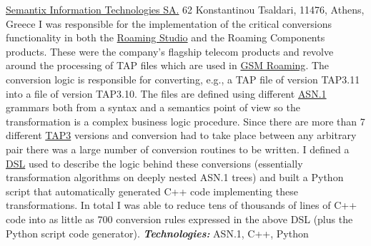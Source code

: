 \documentclass[helvetica,english,logo,notitle,totpages,utf8]{europecv2013}
\newcommand{\technologies}[0]{\textbf{\textit{Technologies:}}}
\begin{document}
\begin{europecv}
                   {\href{http://www.semantix.gr}{Semantix Information Technologies SA.}}
                   {62 Konstantinou Tsaldari, 11476, Athens, Greece}
                   {
    I was responsible for the implementation of the critical 
    conversions functionality in both the \href{http://www.tapeditor.com/}{Roaming Studio} and the Roaming Components products. These were
    the company's flagship telecom products and revolve around the processing of TAP
    files which are used in \href{https://en.wikipedia.org/wiki/Roaming}{GSM Roaming}.
    The conversion logic is responsible for converting, e.g., a TAP file of version TAP3.11 into a file
    of version TAP3.10. The files are defined using
    different \href{https://en.wikipedia.org/wiki/Abstract_Syntax_Notation_One}{ASN.1} grammars both from
    a syntax and a semantics point of view so
    the transformation is a complex business logic procedure. Since there are more than 7 different \href{http://what-when-how.com/roaming-in-wireless-networks/transferred-account-procedures-billing-and-settlement/}{TAP3}
    versions and conversion had to take place between any arbitrary pair there was
    a large number of conversion routines to be written. I defined a
    \href{https://en.wikipedia.org/wiki/Domain-specific_language}{DSL} used to describe the logic
    behind these conversions (essentially transformation algorithms on deeply nested ASN.1 trees) and built a Python
    script that automatically generated C++ code implementing these transformations. In total I was able to
    reduce tens of thousands of lines of C++ code into as little as 700 conversion rules expressed in the
    above DSL
    (plus the Python script code generator).
    \technologies{} ASN.1, C++, Python
                   }                   


\end{europecv}
\end{document}
